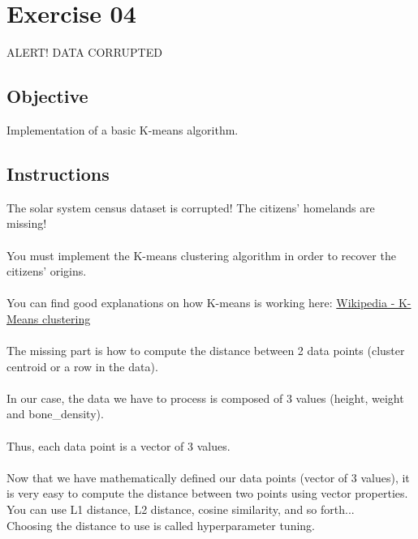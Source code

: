 \chapter{Exercise 04}
\makeheaderfilesforbidden

ALERT! DATA CORRUPTED

\section*{Objective}
Implementation of a basic K-means algorithm.

\section*{Instructions}
The solar system census dataset is corrupted! The citizens' homelands are missing!\\  
\\
You must implement the K-means clustering algorithm in order to recover the citizens' origins.\\
\\
You can find good explanations on how K-means is working here:
\href{https://en.wikipedia.org/wiki/K-means_clustering}{Wikipedia - K-Means clustering}\\
\\
The missing part is how to compute the distance between 2 data points (cluster centroid or a row in the data).\\
\\
In our case, the data we have to process is composed of 3 values (height, weight and bone\_density).\\
\\
Thus, each data point is a vector of 3 values.\\
\\
Now that we have mathematically defined our data points (vector of 3 values), it is very easy to compute the distance between two points using vector properties.\\
You can use L1 distance, L2 distance, cosine similarity, and so forth...\\
Choosing the distance to use is called hyperparameter tuning.\\
\newline
